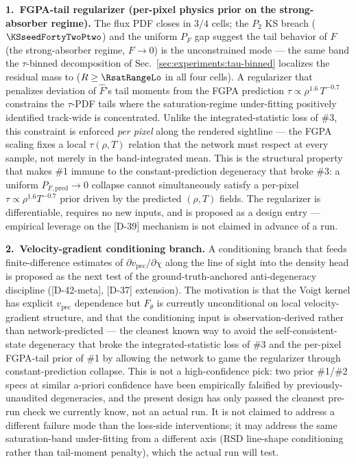 \textbf{1.\ FGPA-tail regularizer (per-pixel physics prior on the strong-absorber regime).} The flux PDF closes in $3/4$ cells; the $P_2$ KS breach ($\KSseedFortyTwoPtwo$) and the uniform $P_F$ gap suggest the tail behavior of $F$ (the strong-absorber regime, $F \to 0$) is the unconstrained mode --- the same band the $\tau$-binned decomposition of Sec.~\ref{sec:experiments:tau-binned} localizes the residual mass to ($R \geq \RsatRangeLo$ in all four cells). A regularizer that penalizes deviation of $\hat F$'s tail moments from the FGPA prediction $\tau \propto \rho^{1.6}\,T^{-0.7}$~\cite{bi_davidsen1997,hui_gnedin1997} constrains the $\tau$-PDF tails where the saturation-regime under-fitting positively identified track-wide is concentrated. Unlike the integrated-statistic loss of \#3, this constraint is enforced \emph{per pixel} along the rendered sightline --- the FGPA scaling fixes a local $\tau(\rho, T)$ relation that the network must respect at every sample, not merely in the band-integrated mean. This is the structural property that makes \#1 immune to the constant-prediction degeneracy that broke \#3: a uniform $P_{F,\text{pred}}\!\to\!0$ collapse cannot simultaneously satisfy a per-pixel $\tau\!\propto\!\rho^{1.6}T^{-0.7}$ prior driven by the predicted $(\rho, T)$ fields. The regularizer is differentiable, requires no new inputs, and is proposed as a design entry --- empirical leverage on the [D-39] mechanism is not claimed in advance of a run.

\textbf{2.\ Velocity-gradient conditioning branch.} A conditioning branch that feeds finite-difference estimates of $\partial v_{\text{pec}}/\partial \chi$ along the line of sight into the density head is proposed as the next test of the ground-truth-anchored anti-degeneracy discipline ([D-42-meta], [D-37] extension). The motivation is that the Voigt kernel has explicit $v_{\text{pec}}$ dependence but $F_\theta$ is currently unconditional on local velocity-gradient structure, and that the conditioning input is observation-derived rather than network-predicted --- the cleanest known way to avoid the self-consistent-state degeneracy that broke the integrated-statistic loss of \#3 and the per-pixel FGPA-tail prior of \#1 by allowing the network to game the regularizer through constant-prediction collapse. This is not a high-confidence pick: two prior \#1/\#2 specs at similar a-priori confidence have been empirically falsified by previously-unaudited degeneracies, and the present design has only passed the cleanest pre-run check we currently know, not an actual run. It is not claimed to address a different failure mode than the loss-side interventions; it may address the same saturation-band under-fitting from a different axis (RSD line-shape conditioning rather than tail-moment penalty), which the actual run will test.


